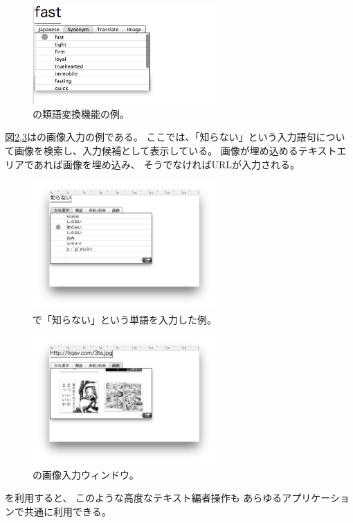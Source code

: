 \begin{figure}[H]
\centerline{\includegraphics[width=70mm,bb=0 0 350 250]{figures/synonym.png}}
\caption{{\system}の類語変換機能の例。}
\label{synonym}
\end{figure}

図\ref{image1},\ref{image2}は{\system}の画像入力の例である。
ここでは、「知らない」という入力語句について画像を検索し、入力候補として表示している。
画像が埋め込めるテキストエリアであれば画像を埋め込み、
そうでなければURLが入力される。

\begin{figure}[H]
\centerline{\includegraphics[width=70mm,bb=0 0 600 400]{figures/image1.png}}
\caption{{\system}で「知らない」という単語を入力した例。}
\label{image1}
\end{figure}

\begin{figure}[H]
\centerline{\includegraphics[width=70mm,bb=0 0 600 400]{figures/image2.png}}
\caption{{\system}の画像入力ウィンドウ。}
\label{image2}
\end{figure}

{\system}を利用すると、
このような高度なテキスト編者操作も
あらゆるアプリケーションで共通に利用できる。

